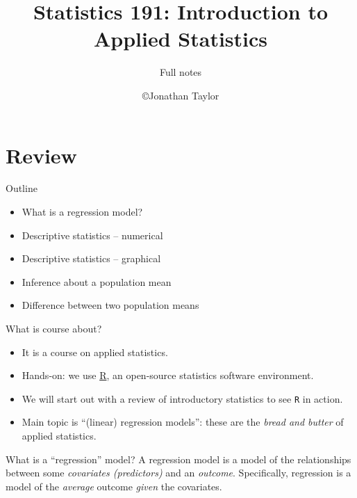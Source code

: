 \documentclass[handout]{beamer}
\title{Statistics 191: Introduction to Applied Statistics}
\subtitle{Full notes}
\author{\copyright Jonathan Taylor \\
   }
\begin{document}
   \begin{frame}
   \titlepage
   \end{frame}

   \part{Review}
   \frame{\partpage}


   \begin{frame} 

   \begin{block}
   {Outline}
   \begin{itemize}

   \item What is a regression model?
   \item Descriptive statistics -- numerical
   \item Descriptive statistics -- graphical
   \item Inference about a population mean
   \item Difference between two population means
   \end{itemize}
   \end{block}
   \end{frame}


   \begin{frame} 

   \begin{block}
   {What is course about?}
   \begin{itemize}
   \item It is a course on applied statistics.

   \item Hands-on: we use \href{http://cran.r-project.org}{R}, an open-source statistics software environment.

   \item We will start out with a review of introductory statistics to see {\tt R} in action.
   \item Main topic is ``(linear) regression models'': these are the {\em bread and butter} of applied statistics.

   \end{itemize}
   \end{block}

   \begin{block}
   {What is a ``regression'' model? }
   A regression model is a model of the relationships between some
   {\em covariates (predictors)} and an {\em outcome}.
   Specifically, regression is a model of the {\em average} outcome {\em given}
   the covariates.
   \end{block}
   \end{frame}
\end{document}
